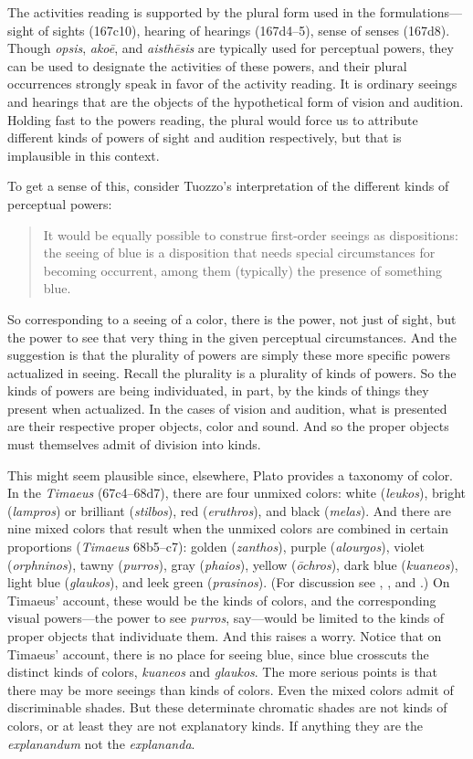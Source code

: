 The activities reading is supported by the plural form used in the formulations—sight of sights (167c10), hearing of hearings (167d4–5), sense of senses (167d8). Though \emph{opsis}, \emph{akoē}, and \emph{aisthēsis} are typically used for perceptual powers, they can be used to designate the activities of these powers, and their plural occurrences strongly speak in favor of the activity reading. It is ordinary seeings and hearings that are the objects of the hypothetical form of vision and audition. Holding fast to the powers reading, the plural would force us to attribute different kinds of powers of sight and audition respectively, but that is implausible in this context. 

To get a sense of this, consider Tuozzo's interpretation of the different kinds of perceptual powers:
\begin{quote}
	It would be equally possible to construe first-order seeings as dispositions: the seeing of blue is a disposition that needs special circumstances for becoming occurrent, among them (typically) the presence of something blue. \citep[219]{Tuozzo:2011aa}
\end{quote}
So corresponding to a seeing of a color, there is the power, not just of sight, but the power to see that very thing in the given perceptual circumstances. And the suggestion is that the plurality of powers are simply these more specific powers actualized in seeing. Recall the plurality is a plurality of kinds of powers. So the kinds of powers are being individuated, in part, by the kinds of things they present when actualized. In the cases of vision and audition, what is presented are their respective proper objects, color and sound. And so the proper objects must themselves admit of division into kinds. 

This might seem plausible since, elsewhere, Plato provides a taxonomy of color. In the \emph{Timaeus} (67c4–68d7), there are four unmixed colors: white (\emph{leukos}), bright (\emph{lampros}) or brilliant (\emph{stilbos}), red (\emph{eruthros}), and black (\emph{melas}). And there are nine mixed colors that result when the unmixed colors are combined in certain proportions (\emph{Timaeus} 68b5–c7): golden (\emph{zanthos}), purple (\emph{alourgos}), violet (\emph{orphninos}), tawny (\emph{purros}), gray (\emph{phaios}), yellow (\emph{ōchros}), dark blue (\emph{kuaneos}), light blue (\emph{glaukos}), and leek green (\emph{prasinos}). (For discussion see \citealt{James:1996pb}, \citealt{Ierodiakonou:2005ly}, and \citealt{Kalderon:2022kl}.) On Timaeus' account, these would be the kinds of colors, and the corresponding visual powers—the power to see \emph{purros}, say—would be limited to the kinds of proper objects that individuate them. And this raises a worry. Notice that on Timaeus' account, there is no place for seeing blue, since blue crosscuts the distinct kinds of colors, \emph{kuaneos} and \emph{glaukos}. The more serious points is that there may be more seeings than kinds of colors. Even the mixed colors admit of discriminable shades. But these determinate chromatic shades are not kinds of colors, or at least they are not explanatory kinds. If anything they are the \emph{explanandum} not the \emph{explananda}.

